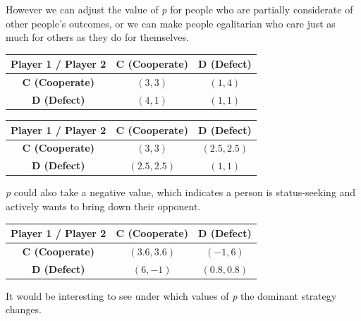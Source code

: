 \documentclass[11pt,preprint]{elsarticle}
\let\origtable\table
\let\endorigtable\endtable
\renewenvironment{table}[1][2] {
    \expandafter\origtable\expandafter[H]
} {
    \endorigtable
}
\numberwithin{equation}{section}
\numberwithin{figure}{section}
\numberwithin{table}{section}
\begin{document}
However we can adjust the value of \emph{p} for people who are partially
considerate of other people's outcomes, or we can make people
egalitarian who care just as much for others as they do for themselves.

\begin{table}[ht]
\centering
\begin{tabular}{|c|c|c|}
\hline
\textbf{Player 1 / Player 2} & \textbf{C (Cooperate)} & \textbf{D (Defect)} \\
\hline
\textbf{C (Cooperate)} & $(3, 3)$ & $(1, 4)$ \\
\hline
\textbf{D (Defect)} & $(4, 1)$ & $(1, 1)$ \\
\hline
\end{tabular}
\caption{Prisoner's Dilemma Payoff Matrix for $p = 0.2$ (Partially considers others' outcomes)}
\end{table}

\begin{table}[ht]
\centering
\begin{tabular}{|c|c|c|}
\hline
\textbf{Player 1 / Player 2} & \textbf{C (Cooperate)} & \textbf{D (Defect)} \\
\hline
\textbf{C (Cooperate)} & $(3, 3)$ & $(2.5, 2.5)$ \\
\hline
\textbf{D (Defect)} & $(2.5, 2.5)$ & $(1, 1)$ \\
\hline
\end{tabular}
\caption{Prisoner's Dilemma Payoff Matrix for $p = 0.5$ (Egalitarian person)}
\end{table}

\emph{p} could also take a negative value, which indicates a person is
status-seeking and actively wants to bring down their opponent.

\begin{table}[ht]
\centering
\begin{tabular}{|c|c|c|}
\hline
\textbf{Player 1 / Player 2} & \textbf{C (Cooperate)} & \textbf{D (Defect)} \\
\hline
\textbf{C (Cooperate)} & $(3.6, 3.6)$ & $(-1, 6)$ \\
\hline
\textbf{D (Defect)} & $(6, -1)$ & $(0.8, 0.8)$ \\
\hline
\end{tabular}
\caption{Prisoner's Dilemma Payoff Matrix for $p = -0.2$ (Negative influence by others' outcomes)}
\end{table}

It would be interesting to see under which values of \emph{p} the
dominant strategy changes.
\end{document}
